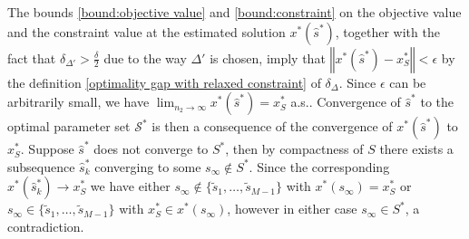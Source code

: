 \documentclass[mnsc,blindrev]{informs4} %
\newcommand{\norm}[1]{\left \Vert #1 \right\Vert}
\begin{document}
The bounds \eqref{bound:objective value} and \eqref{bound:constraint} on the objective value and the constraint value at the estimated solution $x^*(\hat s^*)$, together with the fact that $\delta_{\Delta'}>\frac{\delta}{2}$ due to the way $\Delta'$ is chosen, imply that $\norm{x^*(\hat s^*)-x_S^*}<\epsilon$ by the definition \eqref{optimality gap with relaxed constraint} of $\delta_{\Delta}$. Since $\epsilon$ can be arbitrarily small, we have $\lim_{n_2\to\infty}x^*(\hat{s}^*)=x_S^*$ a.s.. Convergence of $\hat s^*$ to the optimal parameter set $\mathcal S^*$ is then a consequence of the convergence of $x^*(\hat s^*)$ to $x_S^*$. Suppose $\hat s^*$ does not converge to $S^*$, then by compactness of $S$ there exists a subsequence $\hat s^*_{k}$ converging to some $s_{\infty}\notin S^*$. Since the corresponding $x^*(\hat s^*_k)\to x_S^*$ we have either $s_{\infty}\notin\{\tilde s_1,\ldots,\tilde s_{M-1}\}$ with $x^*(s_{\infty})=x_S^*$ or $s_{\infty}\in\{\tilde s_1,\ldots,\tilde s_{M-1}\}$ with $x_S^*\in x^*(s_{\infty})$, however in either case $s_{\infty}\in S^*$, a contradiction.


\end{document}
